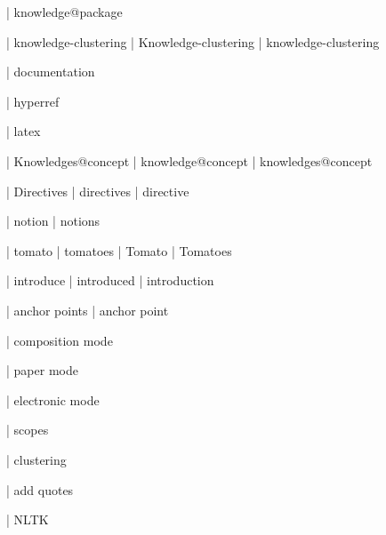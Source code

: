  | knowledge@package

 | knowledge-clustering
 | Knowledge-clustering
 | knowledge-cluste\-ring

 | documentation

 | hyperref

 | latex

 | Knowledges@concept
 | knowledge@concept
 | knowledges@concept

 | Directives
 | directives
 | directive

 | notion
 | notions

 | tomato
 | tomatoes
 | Tomato
 | Tomatoes

 | introduce
 | introduced
 | introduction

 | anchor points
 | anchor point

 | composition mode

 | paper mode

 | electronic mode

 | scopes

 | clustering

 | add quotes

 | NLTK